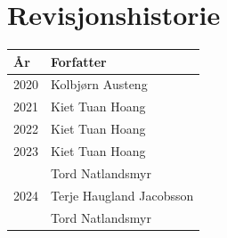\section*{Revisjonshistorie}
\begin{center}
 \begin{tabular}{|p{2.5cm} p{5.5cm}|} 
 \hline
 År & Forfatter \\ [0.5ex] 
 \hline\hline
 2020 & Kolbjørn Austeng\\
 \hline
 2021 & Kiet Tuan Hoang\\
 \hline
 2022 & Kiet Tuan Hoang \\ 
 \hline
 2023 & Kiet Tuan Hoang \\
      & Tord Natlandsmyr \\
 \hline
 2024 & Terje Haugland Jacobsson \\
      & Tord Natlandsmyr \\
 \hline
\end{tabular}
\end{center}

